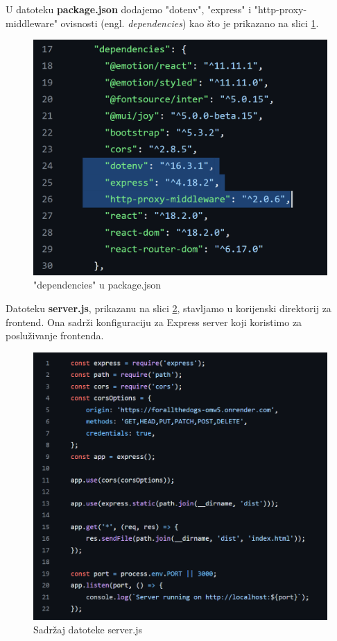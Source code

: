 			U datoteku \textbf{package.json} dodajemo "dotenv", "express" i "http-proxy-middleware" ovisnosti (engl. \textit{dependencies}) kao što je prikazano na slici \ref{dependencies}.
			
			\begin{figure}[H]
				\includegraphics[scale=0.6]{slike/dependencies.PNG} 
				\centering
				\caption{"dependencies" u package.json}
				\label{dependencies}
			\end{figure}
			
			Datoteku \textbf{server.js}, prikazanu na slici \ref{server_js}, stavljamo u korijenski direktorij za frontend. Ona sadrži konfiguraciju za Express server koji koristimo za posluživanje frontenda.
			
			\begin{figure}[H]
				\includegraphics[scale=0.6]{slike/server_js.PNG} 
				\centering
				\caption{Sadržaj datoteke server.js}
				\label{server_js}
			\end{figure}
			
